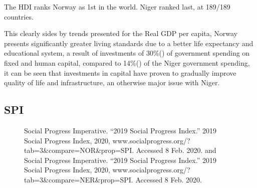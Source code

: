 \documentclass[11pt, a4paper]{article}
\begin{document}
			The HDI ranks Norway as 1st in the world. Niger ranked last, at 189/189 countries. 

			This clearly sides by trends presented for the Real GDP per capita, Norway presents significantly greater living standards due to a better life expectancy and educational system, a result of investments of 30\%(\citeauthor{NorwayEconomy20192019}) of government spending on fixed and human capital, compared to 14\%(\citeauthor{NigerEconomy20192019}) of the Niger government spending, it can be seen that investments in capital have proven to gradually improve quality of life and infrastructure, an otherwise major issue with Niger.

			\vspace*{-6mm}
			\subsection{SPI}
			\vspace*{-5mm}
			\begin{figure}[H]
				\begin{center}
		\end{center}
		\vspace*{-6mm}
		\caption{Social Progress Imperative. “2019 Social Progress Index.” 2019 Social Progress Index, 2020, www.socialprogress.org/?tab=3\&compare=NOR\&prop=SPI. Accessed 8 Feb. 2020. and Social Progress Imperative. “2019 Social Progress Index.” 2019 Social Progress Index, 2020, www.socialprogress.org/?tab=3\&compare=NER\&prop=SPI. Accessed 8 Feb. 2020.}
		\end{figure}
\end{document}
